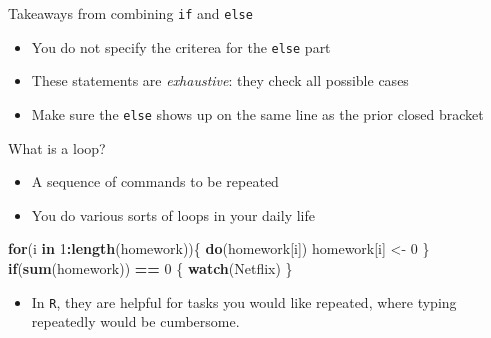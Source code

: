 \documentclass[ignorenonframetext,]{beamer}
\newenvironment{Shaded}{\begin{snugshade}}{\end{snugshade}}
\newcommand{\KeywordTok}[1]{\textcolor[rgb]{0.13,0.29,0.53}{\textbf{#1}}}
\newcommand{\DecValTok}[1]{\textcolor[rgb]{0.00,0.00,0.81}{#1}}
\newcommand{\StringTok}[1]{\textcolor[rgb]{0.31,0.60,0.02}{#1}}
\newcommand{\ControlFlowTok}[1]{\textcolor[rgb]{0.13,0.29,0.53}{\textbf{#1}}}
\newcommand{\OperatorTok}[1]{\textcolor[rgb]{0.81,0.36,0.00}{\textbf{#1}}}
\newcommand{\NormalTok}[1]{#1}
\providecommand{\tightlist}{%
	\setlength{\itemsep}{0pt}\setlength{\parskip}{0pt}}
\begin{document}
\begin{frame}[fragile]{Takeaways from combining \texttt{if} and
\texttt{else}}

\begin{itemize}
\tightlist
\item
  You do not specify the criterea for the \texttt{else} part
\item
  These statements are \textit{exhaustive}: they check \alert{all}
  possible cases
\item
  Make sure the \texttt{else} shows up on the same line as the prior
  closed bracket
\end{itemize}

\end{frame}

\begin{frame}[fragile]{What is a loop?}

\begin{itemize}
\tightlist
\item
  A sequence of commands to be repeated
\item
  You do various sorts of loops in your daily life
\end{itemize}

\begin{Shaded}
\begin{Highlighting}[]
\ControlFlowTok{for}\NormalTok{(i }\ControlFlowTok{in} \DecValTok{1}\OperatorTok{:}\KeywordTok{length}\NormalTok{(homework))\{}
  \KeywordTok{do}\NormalTok{(homework[i])}
\NormalTok{  homework[i] <-}\StringTok{ }\DecValTok{0}
\NormalTok{\}}
\ControlFlowTok{if}\NormalTok{(}\KeywordTok{sum}\NormalTok{(homework)) }\OperatorTok{==}\StringTok{ }\DecValTok{0}\NormalTok{ \{}
  \KeywordTok{watch}\NormalTok{(Netflix)}
\NormalTok{\}}
\end{Highlighting}
\end{Shaded}

\begin{itemize}
\tightlist
\item
  In \texttt{R}, they are helpful for tasks you would like repeated,
  where typing repeatedly would be cumbersome.
\end{itemize}

\end{frame}
\end{document}
